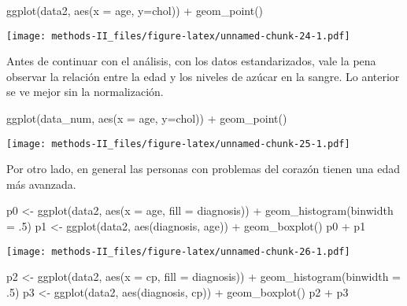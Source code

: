\documentclass[
]{article}
\newenvironment{Shaded}{\begin{snugshade}}{\end{snugshade}}
\newcommand{\AttributeTok}[1]{\textcolor[rgb]{0.77,0.63,0.00}{#1}}
\newcommand{\DecValTok}[1]{\textcolor[rgb]{0.00,0.00,0.81}{#1}}
\newcommand{\FunctionTok}[1]{\textcolor[rgb]{0.00,0.00,0.00}{#1}}
\newcommand{\NormalTok}[1]{#1}
\newcommand{\OtherTok}[1]{\textcolor[rgb]{0.56,0.35,0.01}{#1}}
\newcommand{\SpecialCharTok}[1]{\textcolor[rgb]{0.00,0.00,0.00}{#1}}
\begin{document}
\begin{Shaded}
\begin{Highlighting}[]
\FunctionTok{ggplot}\NormalTok{(data2, }
       \FunctionTok{aes}\NormalTok{(}\AttributeTok{x =}\NormalTok{ age, }
           \AttributeTok{y=}\NormalTok{chol)) }\SpecialCharTok{+}
\FunctionTok{geom\_point}\NormalTok{()}
\end{Highlighting}
\end{Shaded}

\texttt{[image: methods-II\_files/figure-latex/unnamed-chunk-24-1.pdf]}

Antes de continuar con el análisis, con los datos estandarizados, vale
la pena observar la relación entre la edad y los niveles de azúcar en la
sangre. Lo anterior se ve mejor sin la normalización.

\begin{Shaded}
\begin{Highlighting}[]
\FunctionTok{ggplot}\NormalTok{(data\_num, }
       \FunctionTok{aes}\NormalTok{(}\AttributeTok{x =}\NormalTok{ age, }
           \AttributeTok{y=}\NormalTok{chol)) }\SpecialCharTok{+}
\FunctionTok{geom\_point}\NormalTok{()}
\end{Highlighting}
\end{Shaded}

\texttt{[image: methods-II\_files/figure-latex/unnamed-chunk-25-1.pdf]}

Por otro lado, en general las personas con problemas del corazón tienen
una edad más avanzada.

\begin{Shaded}
\begin{Highlighting}[]
\NormalTok{p0 }\OtherTok{\textless{}{-}} \FunctionTok{ggplot}\NormalTok{(data2, }\FunctionTok{aes}\NormalTok{(}\AttributeTok{x =}\NormalTok{ age, }\AttributeTok{fill =}\NormalTok{ diagnosis)) }\SpecialCharTok{+}
\FunctionTok{geom\_histogram}\NormalTok{(}\AttributeTok{binwidth =}\NormalTok{ .}\DecValTok{5}\NormalTok{)}
\NormalTok{p1 }\OtherTok{\textless{}{-}} \FunctionTok{ggplot}\NormalTok{(data2, }\FunctionTok{aes}\NormalTok{(diagnosis, age)) }\SpecialCharTok{+} \FunctionTok{geom\_boxplot}\NormalTok{()}
\NormalTok{p0 }\SpecialCharTok{+}\NormalTok{ p1}
\end{Highlighting}
\end{Shaded}

\texttt{[image: methods-II\_files/figure-latex/unnamed-chunk-26-1.pdf]}

\begin{Shaded}
\begin{Highlighting}[]
\NormalTok{p2 }\OtherTok{\textless{}{-}} \FunctionTok{ggplot}\NormalTok{(data2, }\FunctionTok{aes}\NormalTok{(}\AttributeTok{x =}\NormalTok{ cp, }\AttributeTok{fill =}\NormalTok{ diagnosis)) }\SpecialCharTok{+}
\FunctionTok{geom\_histogram}\NormalTok{(}\AttributeTok{binwidth =}\NormalTok{ .}\DecValTok{5}\NormalTok{)}
\NormalTok{p3 }\OtherTok{\textless{}{-}} \FunctionTok{ggplot}\NormalTok{(data2, }\FunctionTok{aes}\NormalTok{(diagnosis, cp)) }\SpecialCharTok{+} \FunctionTok{geom\_boxplot}\NormalTok{()}
\NormalTok{p2 }\SpecialCharTok{+}\NormalTok{ p3}
\end{Highlighting}
\end{Shaded}
\end{document}
